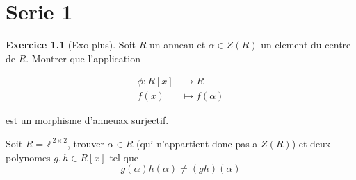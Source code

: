 \documentclass[a4paper,12pt,french]{report}
\theoremstyle{plain}
\theoremstyle{definition}
\newtheorem{exercise}{Exercice}[chapter]
\begin{document}
\chapter{Serie 1}
\begin{exercise}[Exo plus]
Soit $R$ un anneau et $\alpha \in Z(R)$ un element du centre de $R$. Montrer que l'application

\begin{align}
\phi : R[x] & \to R \\
f(x) & \mapsto f(\alpha)
\end{align}

est un morphisme d'anneuax surjectif.

Soit $R=\mathbb{Z}^{2\times 2}$, trouver $\alpha \in R$ (qui n'appartient donc pas a $Z(R)$) et deux polynomes $g,h\in R[x]$ tel que
$$
g(\alpha)h(\alpha)\neq (gh)(\alpha)
$$
\end{exercise}
\end{document}
